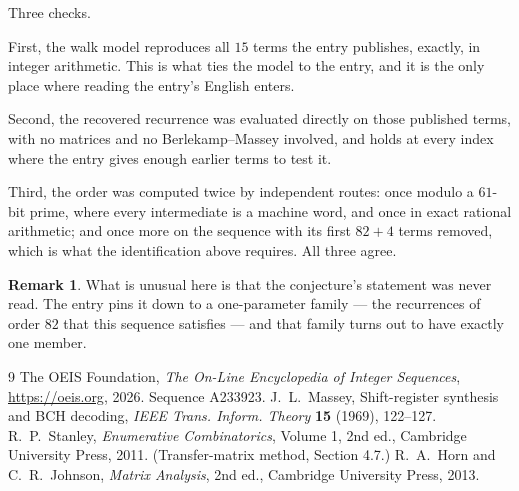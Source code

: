 \documentclass[11pt,a4paper]{article}
\theoremstyle{plain}
\theoremstyle{definition}
\newtheorem{remark}[theorem]{Remark}
\begin{document}
Three checks.

First, the walk model reproduces all $15$ terms the entry publishes, exactly, in integer
arithmetic. This is what ties the model to the entry, and it is the only place where reading
the entry's English enters.

Second, the recovered recurrence was evaluated directly on those published terms, with no
matrices and no Berlekamp--Massey involved, and holds at every index where the entry gives
enough earlier terms to test it.

Third, the order was computed twice by independent routes: once modulo a $61$-bit prime, where
every intermediate is a machine word, and once in exact rational arithmetic; and once more on
the sequence with its first $82+4$ terms removed, which is what the identification above
requires. All three agree.

\begin{remark}
What is unusual here is that the conjecture's statement was never read. The entry pins it down
to a one-parameter family --- the recurrences of order $82$ that this sequence satisfies
--- and that family turns out to have exactly one member.
\end{remark}

\begin{thebibliography}{9}
 The OEIS Foundation, \emph{The On-Line Encyclopedia of Integer
Sequences}, \url{https://oeis.org}, 2026. Sequence A233923.
 J.~L.~Massey, Shift-register synthesis and BCH decoding, \emph{IEEE
Trans. Inform. Theory} \textbf{15} (1969), 122--127.
 R.~P.~Stanley, \emph{Enumerative Combinatorics}, Volume 1, 2nd ed.,
Cambridge University Press, 2011. (Transfer-matrix method, Section 4.7.)
 R.~A.~Horn and C.~R.~Johnson, \emph{Matrix Analysis}, 2nd ed., Cambridge
University Press, 2013.
\end{thebibliography}
\end{document}
